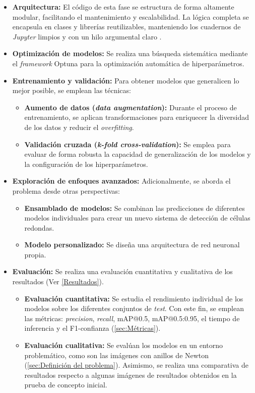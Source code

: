 \documentclass[12pt,a4paper,onecolumn,oneside]{report}
\begin{document}
\begin{itemize}
  \item \textbf{Arquitectura:} El código de esta fase se estructura de forma altamente modular, facilitando el mantenimiento y escalabilidad. La lógica completa se encapsula en clases y librerías reutilizables, manteniendo los cuadernos de \textit{Jupyter} 
  limpios y con un hilo argumental claro \cite{repoTFM}.
  \item \textbf{Optimización de modelos:} Se realiza una búsqueda sistemática mediante el \textit{framework} Optuna \cite{Optuna} para la optimización automática de hiperparámetros.
  \item \textbf{Entrenamiento y validación:} Para obtener modelos que generalicen lo mejor posible, se emplean las técnicas:
  \begin{itemize}
    \item \textbf{Aumento de datos (\textit{data augmentation}):} Durante el proceso de entrenamiento, se aplican transformaciones para enriquecer la diversidad de los datos y reducir el \textit{overfitting}.
    \item \textbf{Validación cruzada (\textit{k-fold cross-validation}):} Se emplea para evaluar de forma robusta la capacidad de generalización de los modelos y la configuración de los hiperparámetros.
  \end{itemize} 
  \item \textbf{Exploración de enfoques avanzados:} Adicionalmente, se aborda el problema desde otras perspectivas:
  \begin{itemize}
    \item \textbf{Ensamblado de modelos:} Se combinan las predicciones de diferentes modelos individuales para crear un nuevo sistema de detección de células redondas. 
    \item \textbf{Modelo personalizado:} Se diseña una arquitectura de red neuronal propia. 
  \end{itemize}
  \item \textbf{Evaluación:} Se realiza una evaluación cuantitativa y cualitativa de los resultados (Ver \autoref{Resultados}).
  \begin{itemize}
    \item \textbf{Evaluación cuantitativa:} Se estudia el rendimiento individual de los modelos sobre los diferentes conjuntos de \textit{test}. Con este fin, se emplean las métricas: 
    \textit{precision}, \textit{recall}, mAP@0.5, mAP@0.5:0.95, el tiempo de inferencia y el F1-confianza (\autoref{sec:Métricas}). 
    \item \textbf{Evaluación cualitativa:} Se evalúan los modelos en un entorno problemático, como son las imágenes con anillos de Newton (\autoref{sec:Definición del problema}). Asimismo, se realiza una comparativa de resultados respecto a algunas imágenes de resultados obtenidos en la prueba de concepto inicial. 
  \end{itemize}
\end{itemize}
\end{document}
